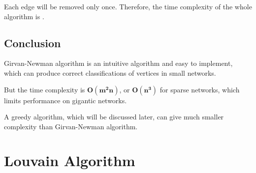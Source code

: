 \documentclass[11pt]{article}
\newtheorem{definition}[theorem]{Definition}
\begin{document}
\noindent Each edge will be removed only once. Therefore, the time complexity of the whole algorithm is .








\subsection{Conclusion}

Girvan-Newman algorithm is an intuitive algorithm and easy to implement, which can produce correct classifications of vertices in small networks. 

\noindent But the time complexity is $\bm{O(m^2n)}$, or $\bm{O(n^3)}$ for sparse networks, which limits performance on gigantic networks.\cite{newman2006} 

\noindent A greedy algorithm, which will be discussed later, can give much smaller complexity than Girvan-Newman algorithm.

\section{Louvain Algorithm}
\end{document}
